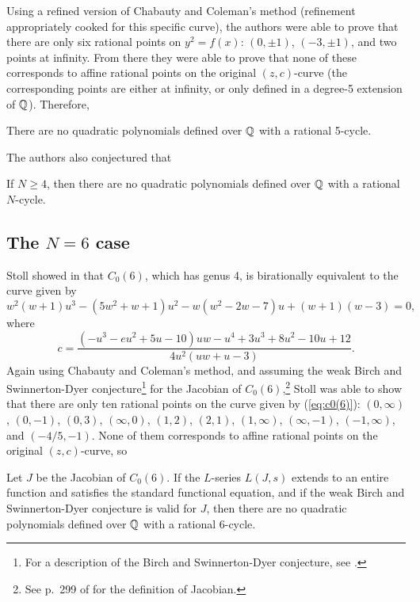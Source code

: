 Using a refined version of Chabauty and Coleman's method (refinement
appropriately cooked for this specific curve), the authors were able
to prove that there are only six rational points on $y^2 = f(x)$: $(0,
\pm 1)$, $(-3, \pm 1)$, and two points at infinity. From there they
were able to prove that none of these corresponds to affine rational
points on the original $(z, c)$-curve (the corresponding points are
either at infinity, or only defined in a degree-5 extension of $\mathbb{Q}$).
Therefore,

\begin{theorem}
  There are no quadratic polynomials defined over $\mathbb{Q}$ with a rational
  5-cycle.
\end{theorem}

The authors also conjectured that

\begin{conjecture}
  If $N \ge 4$, then there are no quadratic polynomials defined over
  $\mathbb{Q}$ with a rational $N$-cycle.
\end{conjecture}

\subsection{The $N = 6$ case}
\label{subsec:model-6}

Stoll showed in \cite{MR2465796} that $C_0(6)$, which has genus 4, is
birationally equivalent to the curve given by
\begin{equation}
  \label{eq:c0(6)}
  w^2(w+1)u^3 - (5w^2+w+1)u^2 - w(w^2-2w-7)u + (w+1)(w-3) = 0,
\end{equation}
where
\begin{equation}
  \label{eq:c-in-uw}
  c = \frac{(-u^3-eu^2+5u-10)uw - u^4 + 3u^3 + 8u^2 - 10u +
    12}{4u^2(uw+u-3)}.
\end{equation}
Again using Chabauty and Coleman's method, and assuming the weak Birch
and Swinnerton-Dyer conjecture\footnote{%
  For a description of the Birch and Swinnerton-Dyer conjecture, see
  \cite{MR2238272}.}
for the Jacobian of $C_0(6)$,\footnote{%
  See p.~299 of \cite{MR1917232} for the definition of Jacobian.
}
Stoll was able to show that there are only ten rational points on the
curve given by (\ref{eq:c0(6)}): $(0, \infty)$, $(0, -1)$, $(0, 3)$,
$(\infty, 0)$, $(1, 2)$, $(2, 1)$, $(1, \infty)$, $(\infty, -1)$,
$(-1, \infty)$, and $(-4/5, -1)$. None of them corresponds to affine
rational points on the original $(z, c)$-curve, so

\begin{theorem}
  Let $J$ be the Jacobian of $C_0(6)$. If the $L$-series $L(J,s)$
  extends to an entire function and satisfies the standard functional
  equation, and if the weak Birch and Swinnerton-Dyer conjecture is
  valid for $J$, then there are no quadratic polynomials defined over
  $\mathbb{Q}$ with a rational 6-cycle.
\end{theorem}

